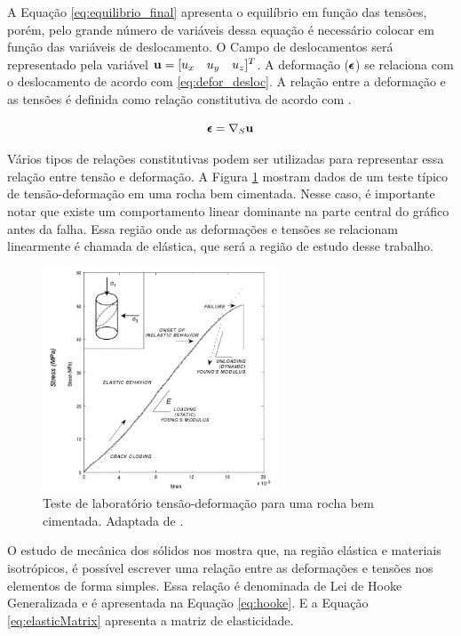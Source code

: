 A Equação \eqref{eq:equilibrio_final} apresenta o equilíbrio em função das tensões, porém, pelo grande número de variáveis dessa equação é necessário colocar em função das variáveis de deslocamento. O Campo de deslocamentos será representado pela variável $\mathbf{u} = [u_x \quad u_y \quad u_z]^T$. A deformação ($\pmb{\epsilon}$) se relaciona com o deslocamento de acordo com \eqref{eq:defor_desloc}. A relação entre a deformação e as tensões é definida como relação constitutiva de acordo com \citet{ResGeomec}. 

\begin{equation}
\label{eq:defor_desloc}
\pmb{\epsilon} = \nabla_S \mathbf{u}
\end{equation}


Vários tipos de relações constitutivas podem ser utilizadas para representar essa relação entre tensão e deformação. A Figura \ref{fig:stress_strain} mostram dados de um teste típico de tensão-deformação em uma rocha bem cimentada. Nesse caso, é importante notar que existe um comportamento linear dominante na parte central do gráfico antes da falha. Essa região onde as deformações e tensões se relacionam linearmente é chamada de elástica, que será a região de estudo desse trabalho. %


\begin{figure}[!htbp]
\centering
\includegraphics[width=7cm]{chap01/stress_strain.PNG}
\caption{Teste de laboratório tensão-deformação para uma rocha bem cimentada. Adaptada de \cite{ResGeomec}.}
\label{fig:stress_strain}
\end{figure}


O estudo de mecânica dos sólidos nos mostra que, na região elástica e materiais isotrópicos, é possível escrever uma relação entre as deformações e tensões nos elementos de forma simples. Essa relação é denominada de Lei de Hooke Generalizada e é apresentada na Equação \eqref{eq:hooke}. E a Equação \eqref{eq:elasticMatrix} apresenta a matriz de elasticidade.


